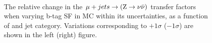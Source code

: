 \begin{figure}[]
  \centering
   ~~
  \\

  \caption{\label{fig:tfSyst_bsf_muToZinv} The relative change in the
  $\mj \rightarrow (\znunu)$ transfer
  factors when varying b-tag SF in MC within its uncertainties, as a function of \scalht and jet category. 
  Variations corresponding to $+1\sigma$ ($-1\sigma$) are shown in the left (right) figure. 
  }
\end{figure}

